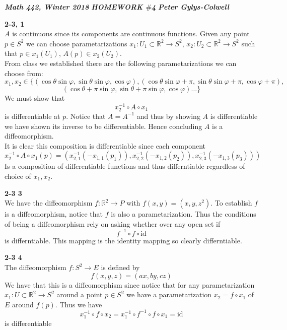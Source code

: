 \documentclass[12pt]{article}
\newenvironment{ques}[1]{\textbf{#1}\vspace{1 mm}\\ }{\bigskip}
\theoremstyle{definition}
\renewcommand{\l}{\left }
\renewcommand{\r}{\right }
\newcommand{\R}{\mathbb R}
\renewcommand{\t}{\theta}
\begin{document}
\noindent \textit{\textbf{Math 442, Winter 2018}} \hspace{1.3cm}
\textit{\textbf{HOMEWORK $\#$4}} \hspace{1.3cm} \textit{\textbf{Peter
Gylys-Colwell}} 

\vspace{1cm}

\begin{ques}{2-3, 1}
	$A$ is continuous since its components are continuous functions. Given any
	point $p \in S^2$ we can choose parametarizations $x_1: U_1 \subset \R^2
	\to S^2$, $x_2: U_2 \subset \R^2 \to S^2$ such that $p \in x_1(U_1)$, $A(p)
	\in x_2(U_2)$.\\
	From class we established there are the following parametarizations we can
	choose from:
	$$x_1,x_2 \in \{(\cos \theta \sin \varphi, \sin \t \sin \varphi, \cos
	\varphi), (\cos \theta \sin \varphi + \pi, \sin \t \sin \varphi + \pi, \cos
	\varphi + \pi),$$
	$$(\cos \theta + \pi \sin \varphi, \sin \t + \pi \sin \varphi, \cos
	\varphi) \dots\}$$
	We must show that 
	$$x_2^{-1} \circ A \circ x_1$$
	is differentiable at $p$. Notice that $A = A^{-1}$ and thus by showing $A$
	is differentiable we have shown its inverse to be differentiable. Hence
	concluding $A$ is a diffeomorphism.\\
	It is clear this composition is differentiable since each component
	$$x_2^{-1} \circ A \circ x_1(p) = (x_{2,1}^{-1}(-x_{1,1}(p_1)),
	x_{2,2}^{-1}(-x_{1,2}(p_2)), x_{2,3}^{-1}(-x_{1,3}(p_3)))$$
	Is a composition of differentiable functions and thus differntiable
	regardless of choice of $x_1, x_2$.
\end{ques}

\begin{ques}{2-3 3}
	We have the diffeomorphism $f: \R^2 \to P$ with $f(x,y) = (x,y,z^2)$. To
	establish $f$ is a diffeomorphism, notice that $f$ is also a
	parametarization. Thus the conditions of being a diffeomorphism rely on
	asking whether over any open set if
	$$f^{-1} \circ f \circ \text{id}$$
	is differntiable. This mapping is the identity mapping so clearly differntiable.
\end{ques}

\begin{ques}{2-3 4}
	The diffeomorphism $f:S^2 \to E$ is defined by 
	$$f(x,y,z) = \l(a x, b y, c z\r)$$
	We have that this is a diffeomorphism since notice that for any
	parametarization $x_1: U \subset \R^2 \to S^2$ around a point $p \in S^2$
	we have a parametarization $x_2 = f \circ x_1$ of $E$ around $f(p)$. Thus we have
	$$x_1^{-1} \circ f \circ x_2 = x_1^{-1} \circ f^{-1} \circ f \circ x_1 =
	\text{id}$$
	is differentiable
\end{ques}
\end{document}
